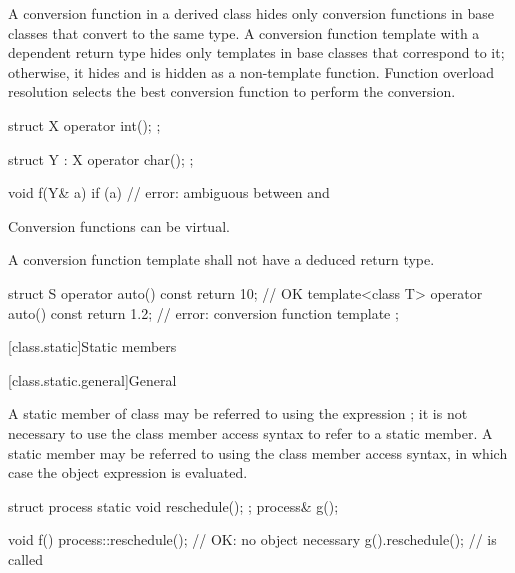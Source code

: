 \pnum
{}%
\begin{note}
A conversion function in a derived class hides only
conversion functions in base classes that convert to the same type.
A conversion function template with a dependent return type hides only
templates in base classes that correspond to it;
otherwise, it hides and is hidden as a non-template function.
Function overload resolution selects
the best conversion function to perform the conversion.
\begin{example}
\begin{codeblock}
struct X {
  operator int();
};

struct Y : X {
    operator char();
};

void f(Y& a) {
  if (a) {          // error: ambiguous between  and 
  }
}
\end{codeblock}
\end{example}
\end{note}

\pnum
{}%
Conversion functions can be virtual.

\pnum
{}%
A conversion function template shall not have a
deduced return type.
\begin{example}
\begin{codeblock}
struct S {
  operator auto() const { return 10; }      // OK
  template<class T>
  operator auto() const { return 1.2; }     // error: conversion function template
};
\end{codeblock}
\end{example}

[class.static]{Static members}%

[class.static.general]{General}%
%

\pnum
A static member  of class  may be referred to
using the  expression ; it is not
necessary to use the class member access syntax to
refer to a static member. A static member may be
referred to using the class member access syntax, in which case the
object expression is evaluated.
\begin{example}
\begin{codeblock}
struct process {
  static void reschedule();
};
process& g();

void f() {
  process::reschedule();        // OK: no object necessary
  g().reschedule();             //  is called
}
\end{codeblock}
\end{example}


